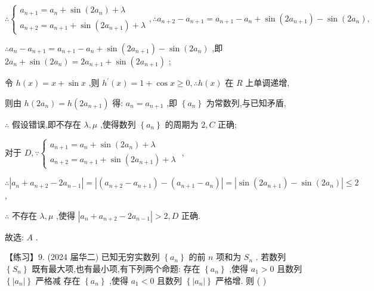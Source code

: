 \documentclass[10pt]{article}
\newcommand*\circled[1]{\tikz[baseline=(char.base)]{\node[shape=circle,draw,inner sep=1.5pt] (char) {\small #1};}}
\begin{document}
\(\therefore \left\{  {\begin{array}{l} {a}_{n + 1} = {a}_{n} + \sin \left( {2{a}_{n}}\right)  + \lambda \\  {a}_{n + 2} = {a}_{n + 1} + \sin \left( {2{a}_{n + 1}}\right)  + \lambda  \end{array},\therefore {a}_{n + 2} - {a}_{n + 1} = {a}_{n + 1} - {a}_{n} + \sin \left( {2{a}_{n + 1}}\right)  - \sin \left( {2{a}_{n}}\right) ,}\right.\)

\(\therefore {a}_{n} - {a}_{n + 1} = {a}_{n + 1} - {a}_{n} + \sin \left( {2{a}_{n + 1}}\right)  - \sin \left( {2{a}_{n}}\right)\) ,即 \(2{a}_{n} + \sin \left( {2{a}_{n}}\right)  = 2{a}_{n + 1} + \sin \left( {2{a}_{n + 1}}\right)\) ;

令 \(h\left( x\right)  = x + \sin x\) ,则 \({h}^{\prime }\left( x\right)  = 1 + \cos x \geq  0,\therefore h\left( x\right)\) 在 \(R\) 上单调递增,

则由 \(h\left( {2{a}_{n}}\right)  = h\left( {2{a}_{n + 1}}\right)\) 得: \({a}_{n} = {a}_{n + 1}\) ,即 \(\left\{  {a}_{n}\right\}\) 为常数列,与已知矛盾,

\(\therefore\) 假设错误,即不存在 \(\lambda ,\mu\) ,使得数列 \(\left\{  {a}_{n}\right\}\) 的周期为 \(2,C\) 正确;

对于 \(D,\because \left\{  \begin{array}{l} {a}_{n + 1} = {a}_{n} + \sin \left( {2{a}_{n}}\right)  + \lambda \\  {a}_{n + 2} = {a}_{n + 1} + \sin \left( {2{a}_{n + 1}}\right)  + \lambda  \end{array}\right.\) ,

\(\therefore \left| {{a}_{n} + {a}_{n + 2} - 2{a}_{n - 1}}\right|  = \left| {\left( {{a}_{n + 2} - {a}_{n + 1}}\right)  - \left( {{a}_{n + 1} - {a}_{n}}\right) }\right|  = \left| {\sin \left( {2{a}_{n + 1}}\right)  - \sin \left( {2{a}_{n}}\right) }\right|  \leq  2\) ,

\(\therefore\) 不存在 \(\lambda ,\mu\) ,使得 \(\left| {{a}_{n} + {a}_{n + 2} - 2{a}_{n - 1}}\right|  > 2,D\) 正确.

故选: \(A\) .

【练习】9. (2024 届华二) 已知无穷实数列 \(\left\{  {a}_{n}\right\}\) 的前 \(n\) 项和为 \({S}_{n}\) . 若数列 \(\left\{  {S}_{n}\right\}\) 既有最大项,也有最小项,有下列两个命题:  \circled{1} 存在 \(\left\{  {a}_{n}\right\}\) ,使得 \({a}_{1} > 0\) 且数列 \(\left\{  \left| {a}_{n}\right| \right\}\) 严格减 \circled{2} 存在 \(\left\{  {a}_{n}\right\}\) ,使得 \({a}_{1} < 0\) 且数列 \(\left\{  \left| {a}_{n}\right| \right\}\) 严格增. 则 ( )
\end{document}
